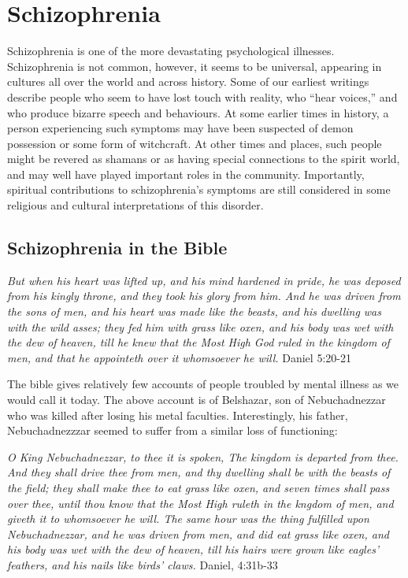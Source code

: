 \documentclass[
]{book}
\begin{document}
\hypertarget{schizophrenia}{%
\section{Schizophrenia}\label{schizophrenia}}

Schizophrenia is one of the more devastating psychological illnesses. Schizophrenia is not common, however, it seems to be universal, appearing in cultures all over the world and across history. Some of our earliest writings describe people who seem to have lost touch with reality, who ``hear voices,'' and who produce bizarre speech and behaviours. At some earlier times in history, a person experiencing such symptoms may have been suspected of demon possession or some form of witchcraft. At other times and places, such people might be revered as shamans or as having special connections to the spirit world, and may well have played important roles in the community. Importantly, spiritual contributions to schizophrenia's symptoms are still considered in some religious and cultural interpretations of this disorder.

\hypertarget{schizophrenia-in-the-bible}{%
\subsection*{Schizophrenia in the Bible}\label{schizophrenia-in-the-bible}}

\emph{But when his heart was lifted up, and his mind hardened in pride, he was deposed from his kingly throne, and they took his glory from him. And he was driven from the sons of men, and his heart was made like the beasts, and his dwelling was with the wild asses; they fed him with grass like oxen, and his body was wet with the dew of heaven, till he knew that the Most High God ruled in the kingdom of men, and that he appointeth over it whomsoever he will.} Daniel 5:20-21

The bible gives relatively few accounts of people troubled by mental illness as we would call it today. The above account is of Belshazar, son of Nebuchadnezzar who was killed after losing his metal faculties. Interestingly, his father, Nebuchadnezzzar seemed to suffer from a similar loss of functioning:

\emph{O King Nebuchadnezzar, to thee it is spoken, The kingdom is departed from thee. And they shall drive thee from men, and thy dwelling shall be with the beasts of the field; they shall make thee to eat grass like oxen, and seven times shall pass over thee, until thou know that the Most High ruleth in the kngdom of men, and giveth it to whomsoever he will. The same hour was the thing fulfilled upon Nebuchadnezzar, and he was driven from men, and did eat grass like oxen, and his body was wet with the dew of heaven, till his hairs were grown like eagles' feathers, and his nails like birds' claws.} Daniel, 4:31b-33
\end{document}
